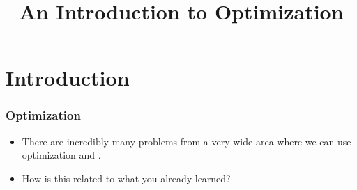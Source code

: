 \documentclass[aspectratio=169,mathserif,notheorems]{beamer}%
\title{An Introduction to Optimization}%
\begin{document}
%
\startPresentation%
%
\section{Introduction}%
%
%
%
%
\begin{frame}%
\frametitle{Optimization}%
\begin{itemize}%
%
\item There are incredibly many problems from a very wide area where we can use optimization and .\medskip%
%
\item<2-> How is this related to what you already learned?%
\end{itemize}%
\end{frame}%
%
\end{document}
